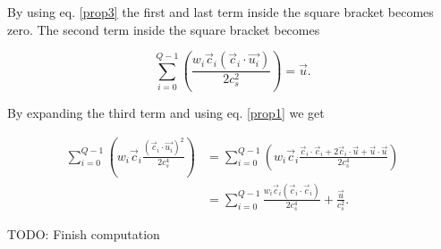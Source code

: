 By using eq. \ref{prop3} the first and last term inside the square bracket 
becomes zero. The second term inside the square bracket becomes

\begin{equation}
    \sum_{i=0}^{Q-1} 
    \left( \frac{w_i\vec{c}_i(\vec{c}_i \cdot \vec{u_i})}{2c_s^2}
    \right) = \vec{u}.
\end{equation}

By expanding the third term and using eq. \ref{prop1} we get

\begin{align}
    \sum_{i=0}^{Q-1} 
    \left( w_i\vec{c}_i\frac{(\vec{c}_i \cdot \vec{u_i})^2}{2c_s^4}
    \right) &=
    \sum_{i=0}^{Q-1} 
    \left( w_i\vec{c}_i\frac{\vec{c}_i\cdot\vec{c}_i + 2\vec{c}_i\cdot\vec{u} + \vec{u}\cdot\vec{u}}{2c_s^4}
    \right)\\
    &= \sum_{i=0}^{Q-1} \frac{w_i\vec{c}_i(\vec{c}_i \cdot \vec{c}_i)}{2c_s^4} + \frac{\vec{u}}{c_s^2}.
\end{align}


TODO: Finish computation
